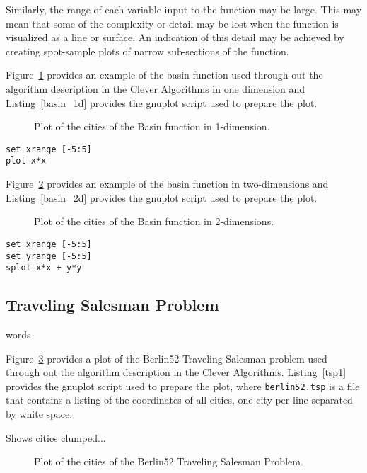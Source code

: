 \documentclass[a4paper, 11pt]{article}
\begin{document}
Similarly, the range of each variable input to the function may be large. This may mean that some of the complexity or detail may be lost when the function is visualized as a line or surface. An indication of this detail may be achieved by creating spot-sample plots of narrow sub-sections of the function. 

Figure~\ref{plot:basin1} provides an example of the basin function used through out the algorithm description in the Clever Algorithms in one dimension and Listing~\ref{basin_1d} provides the gnuplot script used to prepare the plot.

\begin{figure}[htp]

\caption{Plot of the cities of the Basin function in 1-dimension.}
\label{plot:basin1}
\end{figure}

\begin{lstlisting}[caption=Basin Function in 1-dimension, label=basin_1d]
set xrange [-5:5]
plot x*x
\end{lstlisting}

Figure~\ref{plot:basin2} provides an example of the basin function in two-dimensions and Listing~\ref{basin_2d} provides the gnuplot script used to prepare the plot.

\begin{figure}[htp]

\caption{Plot of the cities of the Basin function in 2-dimensions.}
\label{plot:basin2}
\end{figure}

\begin{lstlisting}[caption=Basin Function in 2-dimensions, label=basin_2d]
set xrange [-5:5]
set yrange [-5:5]
splot x*x + y*y
\end{lstlisting}


\subsection{Traveling Salesman Problem}
words

Figure~\ref{plot:tsp1} provides a plot of the Berlin52 Traveling Salesman problem used through out the algorithm description in the Clever Algorithms. Listing~\ref{tsp1} provides the gnuplot script used to prepare the plot, where \texttt{berlin52.tsp} is a file that contains a listing of the coordinates of all cities, one city per line separated by white space.

Shows cities clumped...

\begin{figure}[htp]

\caption{Plot of the cities of the Berlin52 Traveling Salesman Problem.}
\label{plot:tsp1}
\end{figure}
\end{document}
